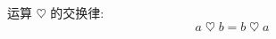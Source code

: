 \documentclass[nofonts]{ctexart}
\begin{document}
运算 $ \heartsuit $ 的交换律:
\[
	a \mathbin{\heartsuit} b = b \mathbin{\heartsuit} a
\]
\end{document}
